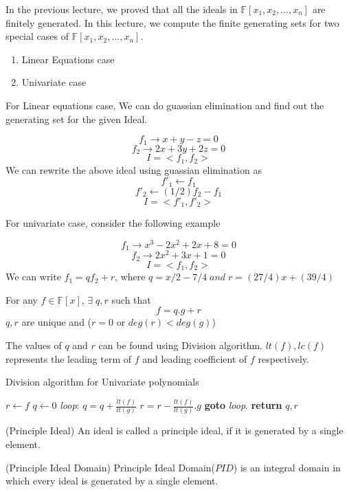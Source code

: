 In the previous lecture, we proved that all the ideals in $\mathbb{F}[x_1,x_2,\ldots,x_n]$ are finitely generated. In this lecture, we compute the finite generating sets for two special cases of $\mathbb{F}[x_1,x_2,\ldots,x_n]$.
\begin{enumerate}
\item Linear Equations case
\item Univariate case
\end{enumerate}
For Linear equations case, We can do guassian elimination and find out the generating set for the given Ideal.
\begin{example}
$$f_1 \rightarrow x+y-z=0$$
$$f_2 \rightarrow 2x+3y+2z=0$$
$$I=<f_1,f_2>$$
We can rewrite the above ideal using guassian elimination as 
$$f'_1 \leftarrow f_1$$
$$f'_2 \leftarrow (1/2)f_2-f_1$$
$$I=<f'_1,f'_2>$$
\end{example}
For univariate case, consider the following example
\begin{example}
$$f_1 \rightarrow x^3-2x^2+2x+8=0$$
$$f_2 \rightarrow 2x^2+3x+1=0$$
$$I=<f_1,f_2>$$
We can write $f_1 = qf_2+r$, where $q=x/2 - 7/4\;and \; r=(27/4)x+(39/4)$\\
\end{example}
\begin{lemma}
For any $f\in \mathbb{F}[x]$, $\exists\;q,r $ such that $$ f=q.g+r $$
$q,r$ are unique and ($r=0$ or $deg(r)<deg(g)$)
\end{lemma}
The values of $q$ and $r$ can be found using Division algorithm. $lt(f),lc(f)$ represents the leading term of $f$ and leading coefficient of $f$ respectively.
\begin{algorithm}
\caption{Division algorithm for Univariate polynomials}\label{euclid}
\begin{algorithmic}[1]
\State $r \leftarrow f$
\State $q \leftarrow 0$
\State \emph{loop}:
\State $q = q + \frac{lt(f)}{lt(g)}$
\State $r=r-\frac{lt(f)}{lt(g)}.g$
\State \textbf{goto} \emph{loop}.
\EndIf
\State \textbf{return} $q,r$
\EndProcedure
\end{algorithmic}
\end{algorithm}
\begin{definition}(Principle Ideal)
An ideal is called a principle ideal, if it is generated by a single element.
\end{definition}
\begin{definition}(Principle Ideal Domain)
Principle Ideal Domain($PID$) is an integral domain in which every ideal is generated by a single element.
\end{definition}
